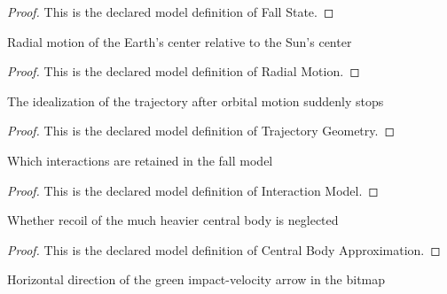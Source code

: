 \begin{proof}
  This is the declared model definition of Fall State.
\end{proof}
\begin{definition}
  \label{def:physics:phyx-mini-0708:phyxminiproblems-problemphyxmini0708-radialmotion}
  Radial motion of the Earth's center relative to the Sun's center
\end{definition}
\begin{proof}
  This is the declared model definition of Radial Motion.
\end{proof}
\begin{definition}
  \label{def:physics:phyx-mini-0708:phyxminiproblems-problemphyxmini0708-trajectorygeometry}
  The idealization of the trajectory after orbital motion suddenly stops
\end{definition}
\begin{proof}
  This is the declared model definition of Trajectory Geometry.
\end{proof}
\begin{definition}
  \label{def:physics:phyx-mini-0708:phyxminiproblems-problemphyxmini0708-interactionmodel}
  Which interactions are retained in the fall model
\end{definition}
\begin{proof}
  This is the declared model definition of Interaction Model.
\end{proof}
\begin{definition}
  \label{def:physics:phyx-mini-0708:phyxminiproblems-problemphyxmini0708-centralbodyapproximation}
  Whether recoil of the much heavier central body is neglected
\end{definition}
\begin{proof}
  This is the declared model definition of Central Body Approximation.
\end{proof}
\begin{definition}
  \label{def:physics:phyx-mini-0708:phyxminiproblems-problemphyxmini0708-horizontaldirection}
  Horizontal direction of the green impact-velocity arrow in the bitmap
\end{definition}
